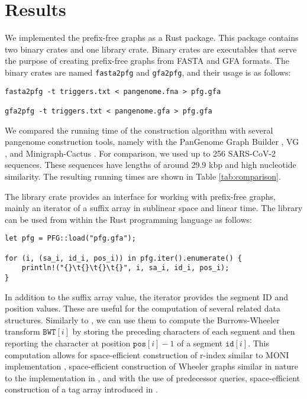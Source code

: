 \section{Results}
We implemented the prefix-free graphs as a Rust package.
This package contains two binary crates and one library crate.
Binary crates are executables that serve the purpose of creating prefix-free graphs from FASTA and GFA formats.
The binary crates are named \texttt{fasta2pfg} and \texttt{gfa2pfg}, and their usage is as follows:

\begin{verbatim}
fasta2pfg -t triggers.txt < pangenome.fna > pfg.gfa

gfa2pfg -t triggers.txt < pangenome.gfa > pfg.gfa
\end{verbatim}

We compared the running time of the construction algorithm with several pangenome construction tools, namely with the PanGenome Graph Builder \cite{garrison2023building}, VG \cite{garrison2018variation}, and Minigraph-Cactus \cite{hickey2023pangenome}.
For comparison, we used up to 256 SARS-CoV-2 sequences.
These sequences have lengths of around 29.9 kbp and high nucleotide similarity.
The resulting running times are shown in Table \ref{tab:comparison}.



The library crate provides an interface for working with prefix-free graphs, mainly an iterator of a suffix array in sublinear space and linear time.
The library can be used from within the Rust programming language as follows:

\begin{verbatim}
let pfg = PFG::load("pfg.gfa");

for (i, (sa_i, id_i, pos_i)) in pfg.iter().enumerate() {
    println!("{}\t{}\t{}\t{}", i, sa_i, id_i, pos_i);
}
\end{verbatim}

In addition to the suffix array value, the iterator provides the segment ID and position values.
These are useful for the computation of several related data structures.
Similarly to \citet{2019boucher}, we can use them to compute the Burrows-Wheeler transform $\texttt{BWT}[i]$ by storing the preceding characters of each segment and then reporting the character at position $\texttt{pos}[i]-1$ of a segment $\texttt{id}[i]$.
This computation allows for space-efficient construction of r-index \cite{gagie2020fully} similar to MONI implementation \cite{rossi2022moni}, space-efficient construction of Wheeler graphs similar in nature to the implementation in \citet{2022pfwg}, and with the use of predecessor queries, space-efficient construction of a tag array introduced in \citet{2022maria}.

